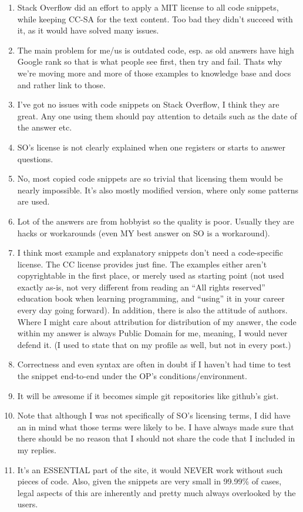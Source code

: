\documentclass{svjour3}                     %
\begin{document}
\begin{enumerate}
	\item Stack Overflow did an effort to apply a MIT license to all code snippets, while keeping CC-SA for the text content. Too bad they didn't succeed with it, as it would have solved many issues.
	\item The main problem for me/us is outdated code, esp. as old answers have high Google rank so that is what people see first, then try and fail. Thats why we're moving more and more of those examples to knowledge base and docs and rather link to those.
	\item I've got no issues with code snippets on Stack Overflow, I think they are great. Any one using them should pay attention to details such as the date of the answer etc.
	\item SO's license is not clearly explained when one registers or starts to answer questions.
	\item No, most copied code snippets are so trivial that licensing them would be nearly impossible. It's also mostly modified version, where only some patterns are used.
	\item Lot of the answers are from hobbyist so the quality is poor. Usually they are hacks or workarounds (even MY best answer on SO is a workaround).
	\item I think most example and explanatory snippets don't need a code-specific license. The CC license provides just fine. The examples either aren't copyrightable in the first place, or merely used as starting point (not used exactly as-is, not very different from reading an ``All rights reserved'' education book when learning programming, and ``using'' it in your career every day going forward). In addition, there is also the attitude of authors. Where I might care about attribution for distribution of my answer, the code within my answer is always Public Domain for me, meaning, I would never defend it. (I used to state that on my profile as well, but not in every post.)
	\item Correctness and even syntax are often in doubt if I haven't had time to test the snippet end-to-end under the OP's conditions/environment.
	\item It will be awesome if it becomes simple git repositories like github's gist.
	\item Note that although I was not specifically of SO's licensing terms, I did have an in mind what those terms were likely to be. I have always made sure that there should be no reason that I should not share the code that I included in my replies.
	\item It's an ESSENTIAL part of the site, it would NEVER work without such pieces of code. Also, given the snippets are very small in 99.99\% of cases, legal aspects of this are inherently and pretty much always overlooked by the users.
\end{enumerate}
\end{document}
